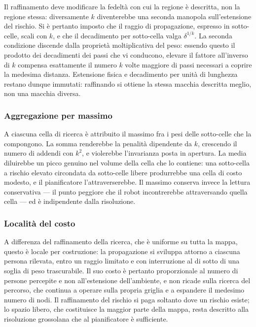 Il raffinamento deve modificare la fedeltà con cui la regione è descritta, non la regione
stessa: diversamente $k$ diventerebbe una seconda manopola sull'estensione del rischio. Si è
pertanto imposto che il raggio di propagazione, espresso in sotto-celle, scali con $k$, e che il
decadimento per sotto-cella valga $\delta^{1/k}$. La seconda condizione discende dalla proprietà
moltiplicativa del peso: essendo questo il prodotto dei decadimenti dei passi che vi conducono,
elevare il fattore all'inverso di $k$ compensa esattamente il numero $k$ volte maggiore di passi
necessari a coprire la medesima distanza. Estensione fisica e decadimento per unità di lunghezza
restano dunque immutati: raffinando si ottiene la stessa macchia descritta meglio, non una
macchia diversa.

\subsubsection{Aggregazione per massimo}

A ciascuna cella di ricerca è attribuito il massimo fra i pesi delle sotto-celle che la
compongono. La somma renderebbe la penalità dipendente da $k$, crescendo il numero di addendi
con $k^2$, e violerebbe l'invarianza posta in apertura. La media diluirebbe un picco genuino nel
volume della cella che lo contiene: una sotto-cella a rischio elevato circondata da sotto-celle
libere produrrebbe una cella di costo modesto, e il pianificatore l'attraverserebbe. Il massimo
conserva invece la lettura conservativa — il punto peggiore che il robot incontrerebbe
attraversando quella cella — ed è indipendente dalla risoluzione.

\subsubsection{Località del costo}

A differenza del raffinamento della ricerca, che è uniforme su tutta la mappa, questo è locale
per costruzione: la propagazione si sviluppa attorno a ciascuna persona rilevata, entro un
raggio limitato e con interruzione al di sotto di una soglia di peso trascurabile. Il suo costo
è pertanto proporzionale al numero di persone percepite e non all'estensione dell'ambiente, e
non ricade sulla ricerca del percorso, che continua a operare sulla propria griglia e a
espandere il medesimo numero di nodi. Il raffinamento del rischio si paga soltanto dove un
rischio esiste; lo spazio libero, che costituisce la maggior parte della mappa, resta descritto
alla risoluzione grossolana che al pianificatore è sufficiente.

